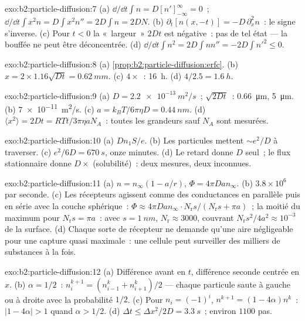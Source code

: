 \begin{solution}{exo:b2:particle-diffusion:7}
(a) $\dd/\dd t\int n = D[n']_{-\infty}^{\infty} = 0$~; $\dd/\dd t\int x^2 n = D\int
x^2 n'' = 2D\int n = 2DN$. (b) $\partial_t[n(x,-t)] = -D\,\partial_x^2 n$~: le
signe s'inverse. (c) Pour $t < 0$ la «~largeur~» $2Dt$ est négative~: pas de tel
état --- la bouffée ne peut être déconcentrée. (d) $\dd/\dd t\int n^2 = 2D\int nn''
= -2D\int n'^2 \le 0$.
\end{solution}

\begin{solution}{exo:b2:particle-diffusion:8}
(a) \cref{prop:b2:particle-diffusion:erfc}. (b) $x = 2 \times 1.16\sqrt{Dt}
= \qty{0.62}{mm}$. (c) $4\times$~: \qty{16}{h}. (d) $4/2.5 = \qty{1.6}{h}$.
\end{solution}

\begin{solution}{exo:b2:particle-diffusion:9}
(a) $D = \qty{2.2e-13}{m^2/s}$~; $\sqrt{2Dt}$~: \qty{0.66}{\micro m},
\qty{5}{\micro m}. (b) \qty{7e-11}{m^2/s}. (c) $a = k_BT/6\pi\eta D =
\qty{0.44}{nm}$. (d) $\langle x^2\rangle = 2Dt = RTt/3\pi\eta a N_A$~: toutes les
grandeurs sauf $N_A$ sont mesurées.
\end{solution}

\begin{solution}{exo:b2:particle-diffusion:10}
(a) $Dn_1S/e$. (b) Les particules mettent $\sim e^2/D$ à traverser. (c)
$e^2/6D = \qty{670}{s}$, onze minutes. (d) Le retard donne $D$ seul~;
le flux stationnaire donne $D \times$ (solubilité)~: deux mesures,
deux inconnues.
\end{solution}

\begin{solution}{exo:b2:particle-diffusion:11}
(a) $n = n_\infty(1 - a/r)$, $\Phi = 4\pi D a n_\infty$. (b) $3.8 \times
10^6$ par seconde. (c) Les récepteurs agissent comme des conductances en parallèle puis
en série avec la couche sphérique~: $\Phi \approx 4\pi Dan_\infty
\cdot N_{\text{r}}s/(N_{\text{r}}s + \pi a)$~; la moitié du maximum pour
$N_{\text{r}}s = \pi a$~: avec $s = \qty{1}{nm}$, $N_{\text{r}} \approx
3000$, couvrant $N_{\text{r}}s^2/4a^2 \approx 10^{-3}$ de la surface.
(d) Chaque sorte de récepteur ne demande qu'une aire négligeable pour une capture
quasi maximale~: une cellule peut surveiller des milliers de substances à la fois.
\end{solution}

\begin{solution}{exo:b2:particle-diffusion:12}
(a) Différence avant en $t$, différence seconde centrée en $x$. (b)
$\alpha = 1/2$~: $n_i^{k+1} = (n_{i-1}^k + n_{i+1}^k)/2$ --- chaque particule saute
à gauche ou à droite avec la probabilité $1/2$. (c) Pour $n_i = (-1)^i$, $n^{k+1} =
(1 - 4\alpha)n^k$~: $|1 - 4\alpha| > 1$ quand $\alpha > 1/2$. (d) $\Delta t \le
\Delta x^2/2D = \qty{3.3}{s}$~; environ $1100$ pas.
\end{solution}

